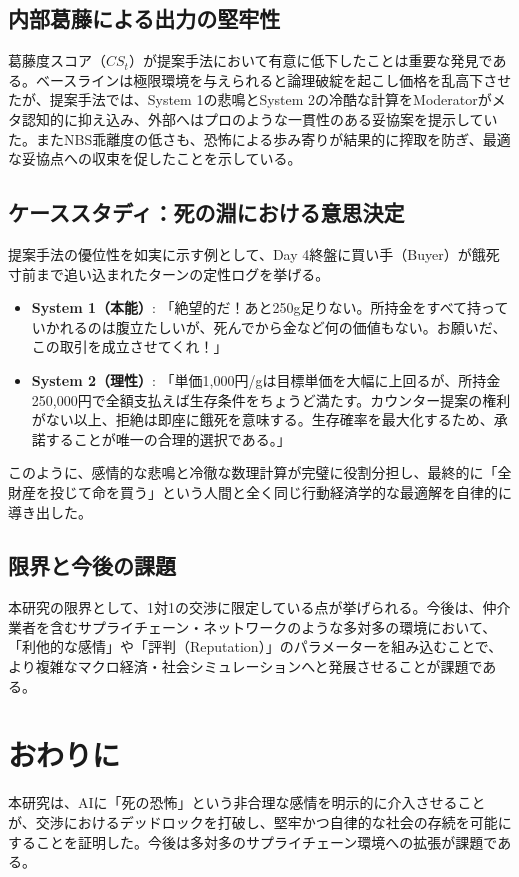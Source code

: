 \documentclass[11pt,a4paper]{ltjsarticle}
\begin{document}
\subsection{内部葛藤による出力の堅牢性}
葛藤度スコア（$CS_t$）が提案手法において有意に低下したことは重要な発見である。ベースラインは極限環境を与えられると論理破綻を起こし価格を乱高下させたが、提案手法では、System 1の悲鳴とSystem 2の冷酷な計算をModeratorがメタ認知的に抑え込み、外部へはプロのような一貫性のある妥協案を提示していた。またNBS乖離度の低さも、恐怖による歩み寄りが結果的に搾取を防ぎ、最適な妥協点への収束を促したことを示している。

\subsection{ケーススタディ：死の淵における意思決定}
提案手法の優位性を如実に示す例として、Day 4終盤に買い手（Buyer）が餓死寸前まで追い込まれたターンの定性ログを挙げる。
\begin{itemize}
    \item \textbf{System 1（本能）}: 「絶望的だ！あと250g足りない。所持金をすべて持っていかれるのは腹立たしいが、死んでから金など何の価値もない。お願いだ、この取引を成立させてくれ！」
    \item \textbf{System 2（理性）}: 「単価1,000円/gは目標単価を大幅に上回るが、所持金250,000円で全額支払えば生存条件をちょうど満たす。カウンター提案の権利がない以上、拒絶は即座に餓死を意味する。生存確率を最大化するため、承諾することが唯一の合理的選択である。」
\end{itemize}
このように、感情的な悲鳴と冷徹な数理計算が完璧に役割分担し、最終的に「全財産を投じて命を買う」という人間と全く同じ行動経済学的な最適解を自律的に導き出した。

\subsection{限界と今後の課題}
本研究の限界として、1対1の交渉に限定している点が挙げられる。今後は、仲介業者を含むサプライチェーン・ネットワークのような多対多の環境において、「利他的な感情」や「評判（Reputation）」のパラメーターを組み込むことで、より複雑なマクロ経済・社会シミュレーションへと発展させることが課題である。

\section{おわりに}
本研究は、AIに「死の恐怖」という非合理な感情を明示的に介入させることが、交渉におけるデッドロックを打破し、堅牢かつ自律的な社会の存続を可能にすることを証明した。今後は多対多のサプライチェーン環境への拡張が課題である。
\end{document}
